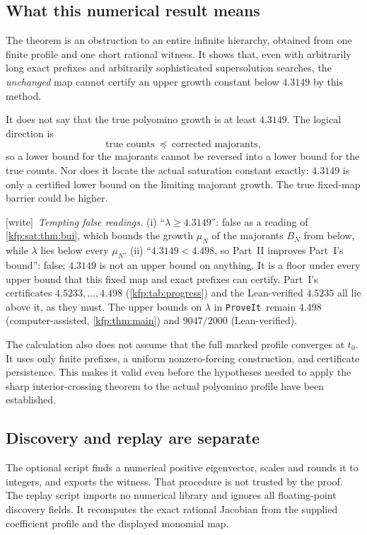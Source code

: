 \documentclass[11pt,a4paper]{article}
\theoremstyle{definition}
\theoremstyle{remark}
\newcommand{\repo}{\texttt{ProveIt}}
\newcommand{\wtag}{\textsf{\small[write]}}
\begin{document}
\subsection{What this numerical result means}
The theorem is an obstruction to an entire infinite hierarchy, obtained
from one finite profile and one short rational witness. It shows that,
even with arbitrarily long exact prefixes and arbitrarily sophisticated
supersolution searches, the \emph{unchanged} map cannot certify an upper
growth constant below $4.3149$ by this method.

It does not say that the true polyomino growth is at least $4.3149$.
The logical direction is
\[
 \text{true counts}\ \preceq\ \text{corrected majorants},
\]
so a lower bound for the majorants cannot be reversed into a lower bound
for the true counts. Nor does it locate the actual saturation constant
exactly: $4.3149$ is only a certified lower bound on the limiting majorant
growth. The true fixed-map barrier could be higher.

\wtag\ \emph{Tempting false readings.} (i) ``$\lambda\ge4.3149$'': false as
a reading of \cref{kfp:sat:thm:bui}, which bounds the growth $\mu_N$ of the
majorants $B_N$ from below, while $\lambda$ lies below every $\mu_N$.
(ii) ``$4.3149<4.498$, so Part~II improves Part~I's bound'': false; $4.3149$
is not an upper bound on anything. It is a floor under every upper bound that
this fixed map and exact prefixes can certify. Part~I's certificates
$4.5233,\ldots,4.498$ (\cref{kfp:tab:progress}) and the Lean-verified
$4.5235$ all lie above it, as they must. The upper bounds on $\lambda$ in
\repo\ remain $4.498$ (computer-assisted, \cref{kfp:thm:main}) and
$9047/2000$ (Lean-verified).

The calculation also does not assume that the full marked profile
converges at $t_0$. It uses only finite prefixes, a uniform nonzero-forcing
construction, and certificate persistence. This makes it valid even before
the hypotheses needed to apply the sharp interior-crossing theorem to the
actual polyomino profile have been established.

\subsection{Discovery and replay are separate}
The optional script  finds a numerical positive
eigenvector, scales and rounds it to integers, and exports the witness.
That procedure is not trusted by the proof. The replay script
 imports no numerical library and ignores all
floating-point discovery fields. It recomputes the exact rational Jacobian
from the supplied coefficient profile and the displayed monomial map.
\end{document}
